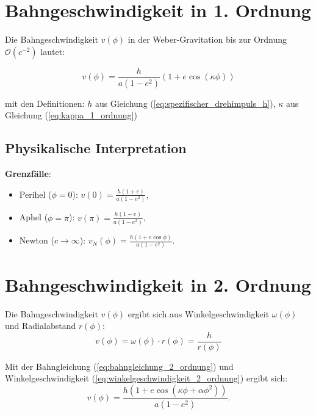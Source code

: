 \section{Bahngeschwindigkeit in 1. Ordnung}
Die Bahngeschwindigkeit \(v(\phi)\) in der Weber-Gravitation bis zur Ordnung \(\mathcal{O}(c^{-2})\) lautet:

\begin{equation}
v(\phi) = \frac{h}{a(1 - e^2)} \left(1 + e \cos\left(\kappa\phi\right)\right)
\end{equation}

\noindent mit den Definitionen:
$h$ aus Gleichung (\ref{eq:spezifischer_drehimpuls_h}), $\kappa$ aus Gleichung (\ref{eq:kappa_1_ordnung})

\subsection*{Physikalische Interpretation}
\textbf{Grenzfälle}:
\begin{itemize}
    \item Perihel (\(\phi = 0\)): \(v(0) = \frac{h(1 + e)}{a(1 - e^2)}\),
    \item Aphel (\(\phi = \pi\)): \(v(\pi) = \frac{h(1 - e)}{a(1 - e^2)}\),
    \item Newton (\(c \to \infty\)): \(v_N(\phi) = \frac{h(1 + e \cos\phi)}{a(1 - e^2)}\).
\end{itemize}

\section{Bahngeschwindigkeit in 2. Ordnung}
Die Bahngeschwindigkeit $v(\phi)$ ergibt sich aus Winkelgeschwindigkeit $\omega(\phi)$ und Radialabstand $r(\phi)$:
\begin{equation}
v(\phi) = \omega(\phi) \cdot r(\phi) = \frac{h}{r(\phi)}
\end{equation}

Mit der Bahngleichung (\ref{eq:bahngleichung_2_ordnung}) und Winkelgeschwindigkeit (\ref{eq:winkelgeschwindigkeit_2_ordnung}) ergibt sich:
\begin{equation}
v(\phi) = \frac{h \left(1 + e\cos(\kappa\phi + \alpha\phi^2)\right)}{a(1 - e^2)}.
\end{equation}
